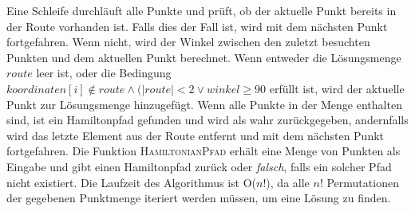 \documentclass[a4paper,10pt,ngerman]{scrartcl}
\begin{document}
    Eine Schleife durchläuft alle Punkte und prüft, ob der aktuelle Punkt bereits in der Route vorhanden ist.
    Falls dies der Fall ist, wird mit dem nächsten Punkt fortgefahren.
    Wenn nicht, wird der Winkel zwischen den zuletzt besuchten Punkten und dem aktuellen Punkt berechnet.
    Wenn entweder die Lösungsmenge $route$ leer ist, oder die Bedingung $\textit{koordinaten}[i] \notin \textit{route} \land (|\textit{route}|<2 \lor \textit{winkel} \geq 90$ erfüllt ist,
    wird der aktuelle Punkt zur Lösungsmenge hinzugefügt.
    Wenn alle Punkte in der Menge enthalten sind, ist ein Hamiltonpfad gefunden und wird als wahr zurückgegeben,
    andernfalls wird das letzte Element aus der Route entfernt und mit dem nächsten Punkt fortgefahren.
    Die Funktion \textsc{HamiltonianPfad} erhält eine Menge von Punkten als Eingabe und gibt einen Hamiltonpfad zurück oder \textit{falsch}, falls ein solcher Pfad nicht existiert.
    Die Laufzeit des Algorithmus ist O($n!$), da alle $n!$ Permutationen der gegebenen Punktmenge iteriert werden müssen, um eine Lösung zu finden.
\end{document}
